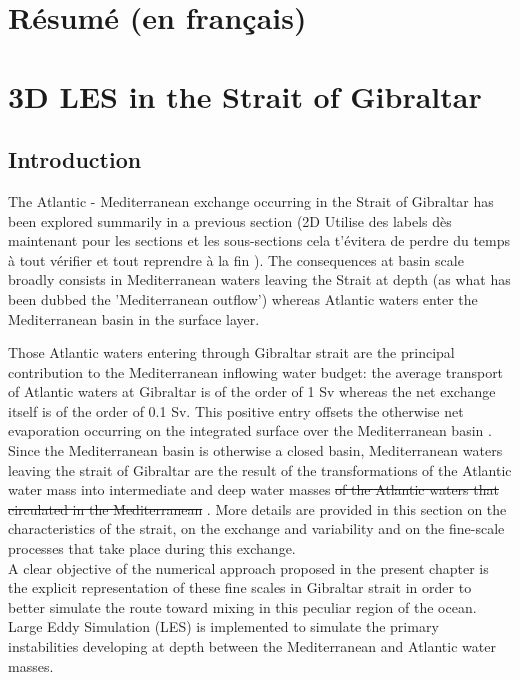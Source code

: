 \hypersetup{pdfborder=0 0 0}

\section{Résumé (en français)}

\color{blue}\section{3D LES in the Strait of Gibraltar} \color{black}
\label{sectionSim3D}
\subsection{Introduction}

The Atlantic - Mediterranean exchange occurring in the Strait of Gibraltar has been \color{blue} explored \color{black} summarily in a previous section (2D \color{blue} Utilise des labels dès maintenant pour les sections et les sous-sections cela t'évitera de perdre du temps à tout vérifier et tout reprendre à la fin \color{black}). \color{blue} The consequences at basin scale broadly \color{black} consists in Mediterranean waters leaving the Strait at depth (as what has been dubbed the 'Mediterranean outflow') whereas \color{blue}Atlantic\color{black} waters enter the Mediterranean basin in the surface layer.

Those Atlantic waters entering through Gibraltar strait are the principal contribution to the Mediterranean inflowing water budget: the average transport of Atlantic waters at \color{blue}Gibraltar \color{black} is of the order of 1 Sv whereas the net exchange itself is of the order of 0.1 Sv. \color{blue} This positive entry offsets the otherwise net evaporation occurring on the integrated surface \color{blue}over \color{black} the Mediterranean basin \citep{bryden_1994}.
Since the Mediterranean basin is otherwise a closed basin, Mediterranean waters leaving the strait of Gibraltar are the result of the transformations \color{blue} of the Atlantic water mass \color{black} into intermediate and deep water masses\color{blue}\sout{ of the Atlantic waters that circulated in the Mediterranean} \color{black}.
More details are provided in this section on the characteristics of the strait, \color{blue} on the exchange and variability and on the fine-scale processes that take place during this exchange.\\
A clear objective of the numerical approach proposed in the present chapter is the explicit representation of these fine scales in Gibraltar strait in order to better simulate the route toward mixing in this peculiar region of the ocean. Large Eddy Simulation (LES) is implemented to simulate the primary instabilities developing at depth between the Mediterranean and Atlantic water masses.

